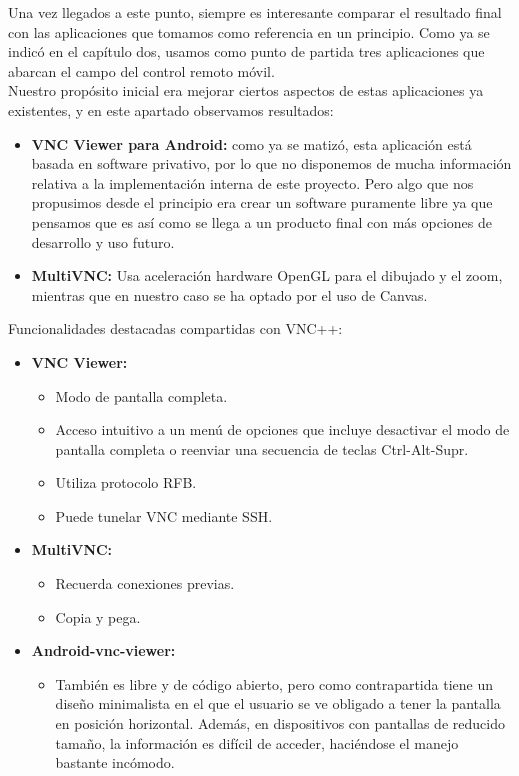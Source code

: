 Una vez llegados a este punto, siempre es interesante comparar el resultado final con las aplicaciones que tomamos como referencia en un principio. Como ya se indicó en el capítulo dos, usamos como punto de partida tres aplicaciones que abarcan el campo del control remoto móvil.\\

Nuestro propósito inicial era mejorar ciertos aspectos de estas aplicaciones ya existentes, y en este apartado observamos resultados:
\begin{itemize}
\item \textbf{VNC Viewer para Android:} como ya se matizó, esta aplicación está basada en software privativo, por lo que no disponemos de mucha información relativa a la implementación interna de este proyecto. Pero algo que nos propusimos desde el principio era crear un software puramente libre ya que pensamos que es así como se llega a un producto final con más opciones de desarrollo y uso futuro.
\item \textbf{MultiVNC:} Usa aceleración hardware OpenGL para el dibujado y el zoom, mientras que en nuestro caso se ha optado por el uso de Canvas.
\end{itemize}

Funcionalidades destacadas compartidas con VNC++:
\begin{itemize}
\item \textbf{VNC Viewer:}
\begin{itemize}
\item Modo de pantalla completa.
\item Acceso intuitivo a un menú de opciones que incluye desactivar el modo de pantalla completa o reenviar una secuencia de teclas Ctrl-Alt-Supr.
\item Utiliza protocolo RFB.
\item Puede tunelar VNC mediante SSH.
\end{itemize}
\item \textbf{MultiVNC:}
\begin{itemize}
\item Recuerda conexiones previas.
\item Copia y pega.
\end{itemize}
\item \textbf{Android-vnc-viewer:}
\begin{itemize}
\item También es libre y de código abierto, pero como contrapartida tiene un diseño minimalista en el que el usuario se ve obligado a tener la pantalla en posición horizontal. Además, en dispositivos con pantallas de reducido tamaño, la información es difícil de acceder, haciéndose el manejo bastante incómodo.
\end{itemize}
\end{itemize}

